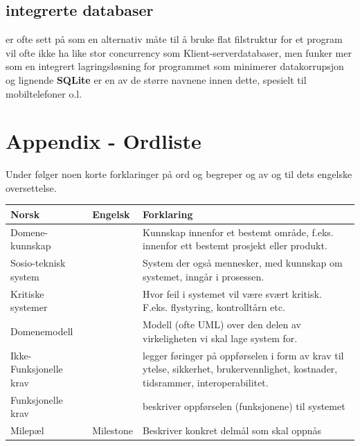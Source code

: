 \documentclass[11pt]{article}
\begin{document}
\subsection{integrerte databaser}
\label{sec-18.2}

   er ofte sett på som en alternativ måte til å bruke flat filstruktur for et program
   vil ofte ikke ha like stor concurrency som Klient-serverdatabaser, men funker mer
   som en integrert lagringsløsning for programmet som minimerer datakorrupsjon og 
   lignende \textbf{SQLite} er en av de større navnene innen dette, spesielt til mobiltelefoner 
   o.l.
\section{Appendix - Ordliste}
\label{sec-19}

  Under følger noen korte forklaringer på ord og begreper og av og til dets engelske oversettelse.


\begin{center}
\begin{tabular}{lll}
\hline
 \textbf{Norsk}          &  \textbf{Engelsk}  &  \textbf{Forklaring}                                                                                                               \\
\hline
 Domene-kunnskap         &                    &  Kunnskap innenfor et bestemt område, f.eks. innenfor ett bestemt prosjekt eller produkt.                                          \\
 Sosio-teknisk system    &                    &  System der også mennesker, med kunnskap om systemet, inngår i prosessen.                                                          \\
 Kritiske systemer       &                    &  Hvor feil i systemet vil være svært kritisk. F.eks. flystyring, kontrolltårn etc.                                                 \\
 Domenemodell            &                    &  Modell (ofte UML) over den delen av virkeligheten vi skal lage system for.                                                        \\
 Ikke-Funksjonelle krav  &                    &  legger føringer på oppførselen i form av krav til ytelse, sikkerhet, brukervennlighet, kostnader, tidsrammer, interoperabilitet.  \\
 Funksjonelle krav       &                    &  beskriver oppførselen (funksjonene) til systemet                                                                                  \\
 Milepæl                 &  Milestone         &  Beskriver konkret delmål som skal oppnås                                                                                          \\
\hline
\end{tabular}
\end{center}
\end{document}
